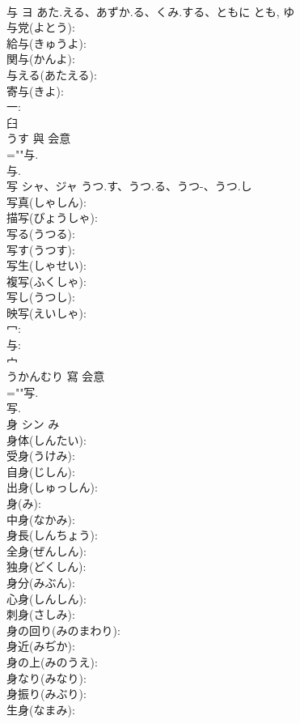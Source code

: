 \documentclass[8pt]{extreport}
\begin{document}
\begin{CJK}{UTF8}{min}
\\	与	ヨ	あた.える、あずか.る、くみ.する、ともに	とも, ゆ	
\\	与党(よとう): 
\\	給与(きゅうよ): 
\\	関与(かんよ): 
\\	与える(あたえる): 
\\	寄与(きよ): 
\\	一: 
\\	臼	
\\	うす	與	会意 
\\	=""与.
\\	与.
\\	写	シャ、ジャ	うつ.す、うつ.る、うつ-、うつ.し		
\\	写真(しゃしん): 
\\	描写(びょうしゃ): 
\\	写る(うつる): 
\\	写す(うつす): 
\\	写生(しゃせい): 
\\	複写(ふくしゃ): 
\\	写し(うつし): 
\\	映写(えいしゃ): 
\\	冖: 
\\	与: 
\\	宀	
\\	うかんむり	寫	会意 
\\	=""写.
\\	写.
\\	身	シン	み		
\\	身体(しんたい): 
\\	受身(うけみ): 
\\	自身(じしん): 
\\	出身(しゅっしん): 
\\	身(み): 
\\	中身(なかみ): 
\\	身長(しんちょう): 
\\	全身(ぜんしん): 
\\	独身(どくしん): 
\\	身分(みぶん): 
\\	心身(しんしん): 
\\	刺身(さしみ): 
\\	身の回り(みのまわり): 
\\	身近(みぢか): 
\\	身の上(みのうえ): 
\\	身なり(みなり): 
\\	身振り(みぶり): 
\\	生身(なまみ): 

\end{CJK}
\end{document}
